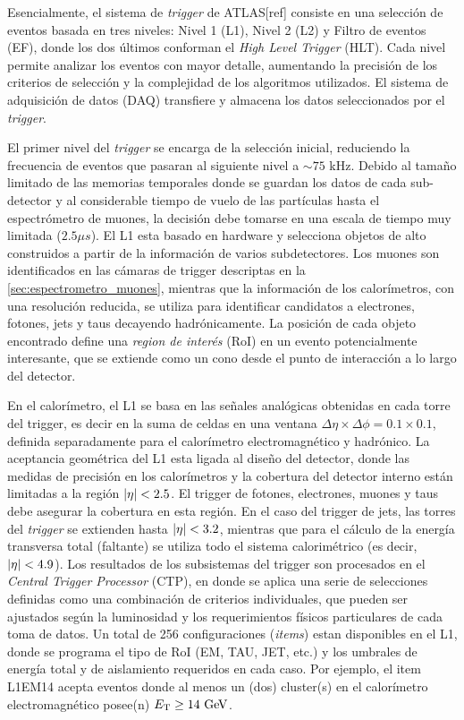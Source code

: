 Esencialmente, el sistema de \emph{trigger} de ATLAS[ref] consiste en una selección
de eventos basada en tres niveles:
Nivel 1 (L1), Nivel 2 (L2) y Filtro de eventos (EF), donde
los dos últimos conforman el \emph{High Level Trigger} (HLT). Cada nivel permite
analizar los eventos con mayor detalle, aumentando la precisión de los criterios
de selección y la complejidad de los algoritmos utilizados. El sistema de
adquisición de datos (DAQ) transfiere y almacena los datos seleccionados por el
\emph{trigger}.

El primer nivel del \emph{trigger} se encarga de la selección inicial, reduciendo la
frecuencia de eventos que pasaran al siguiente nivel a $\sim 75$ kHz. Debido al
tamaño limitado de las memorias temporales donde se guardan los datos
de cada sub-detector y al considerable tiempo de vuelo de las partículas hasta el
espectrómetro de muones, la decisión debe tomarse en una escala de tiempo muy
limitada ($2.5 \mu s$). El L1 esta basado en hardware y selecciona objetos
de alto {\pt} construidos a partir de la información de varios subdetectores.
Los muones son identificados en las cámaras de trigger descriptas en la \cref{sec:espectrometro_muones},
mientras que la información de los calorímetros, con una resolución reducida, se
utiliza para identificar candidatos a electrones, fotones, jets y taus decayendo
hadrónicamente.
La posición de cada objeto encontrado define una \emph{region de
  interés} (RoI) en un evento potencialmente interesante, que se extiende como
un cono desde el punto de interacción a lo largo del detector.

En el calorímetro, el L1 se basa en las señales analógicas obtenidas en cada
torre del trigger, es decir en la suma de celdas en una ventana $\Delta \eta \times \Delta
\phi = 0.1 \times 0.1$, definida separadamente para el calorímetro electromagnético y
hadrónico.
La aceptancia geométrica del L1 esta ligada al diseño del detector, donde las medidas de precisión en los
calorímetros y la cobertura del detector interno están limitadas a la región
$\abseta < 2.5$. El trigger de fotones, electrones, muones y taus debe asegurar
la cobertura en esta región. En el caso del trigger de jets, las torres del \emph{trigger}
se extienden hasta $\abseta < 3.2$, mientras que para el cálculo de la energía
transversa total (faltante) se utiliza todo el sistema calorimétrico (es decir,
$\abseta < 4.9$). Los resultados de los subsistemas del trigger son procesados
en el \emph{Central Trigger Processor} (CTP), en donde se aplica una serie de
selecciones definidas como una combinación de criterios
individuales, que pueden ser ajustados según la luminosidad y los requerimientos
físicos particulares de cada toma de datos. Un total de 256 configuraciones
(\emph{items}) estan disponibles en el L1, donde se programa el tipo de RoI (EM,
TAU, JET, etc.) y los umbrales de energía total y de aislamiento requeridos en
cada caso. Por ejemplo, el item L1EM14 acepta eventos donde al menos un (dos)
cluster(s) en el calorímetro electromagnético posee(n) $\et \geq 14 \GeV$.

